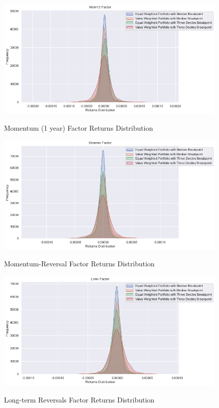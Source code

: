 \begin{figure}[H]
	\caption{Momentum (1 year) Factor Returns Distribution}
	\centering
	\includegraphics[scale=.63]{../../output/figures/mom12.png}
	\label{fig:mom12}
\end{figure}

\begin{figure}[H]
	\caption{Momentum-Reversal Factor Returns Distribution}
	\centering
	\includegraphics[scale=.63]{../../output/figures/momrev.png}
	\label{fig:momrev}
\end{figure}

\begin{figure}[H]
	\caption{Long-term Reversals Factor Returns Distribution}
	\centering
	\includegraphics[scale=.63]{../../output/figures/lrrev.png}
	\label{fig:lrrev}
\end{figure}


